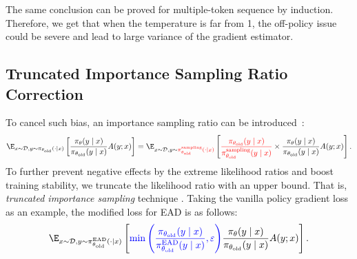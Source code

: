 The same conclusion can be proved for multiple-token sequence by induction. Therefore, we get that
when the temperature is far from 1, the off-policy issue could be severe and lead to large variance of the gradient estimator. 


\subsection{Truncated Importance Sampling Ratio Correction}
\label{subsec:tis-correction}
To cancel such bias, an importance sampling ratio can be introduced~\citep{hilton2022batch,yao2025offpolicy}:
\begin{align*}
\E_{x \sim \mathcal{D},y{\sim} \mathbin{\pi_{\theta_{\text{old}}}(\cdot\mid x)}}\left[\frac{\pi_{\theta}(y\mid x)}{\pi_{\theta_{\text{old}}}(y\mid x)}A(y;x)\right]
=
\E_{x \sim \mathcal{D},y{\sim} \mathbin{\color{red}\pi^{\text{sampling}}_{\theta_{\text{old}}}(\cdot\mid x)}}
\left[{\color{red}\frac{\pi_{\theta_{\text{old}}}(y\mid x)}{\pi^{\text{sampling}}_{\theta_{\text{old}}}(y\mid x)}}\times\frac{\pi_{\theta}(y\mid x)}{\pi_{\theta_{\text{old}}}(y\mid x)}A(y;x)\right]. 
\end{align*}
To further prevent negative effects by the extreme likelihood ratios and boost training stability, we truncate the likelihood ratio with an upper bound. That is, \emph{truncated importance sampling} technique \citep{heckman1998matching}. Taking the vanilla policy gradient loss as an example, the modified loss for EAD is as follows:
\begin{equation*}
\label{eq:tis-pg}
\E_{x \sim \mathcal{D},y{\sim}{\pi^{\text{EAD}}_{\theta_{\text{old}}}(\cdot\mid x)}}
\left[{\color{blue}\min\left(\frac{\pi_{\theta_{\text{old}}}(y\mid x)}{\pi^{\text{EAD}}_{\theta_{\text{old}}}(y\mid x)},\varepsilon\right)}\frac{\pi_{\theta}(y\mid x)}{\pi_{\theta_{\text{old}}}(y\mid x)}A(y;x)\right].
\end{equation*}

